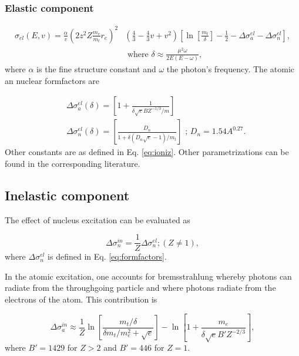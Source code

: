 \subsubsection{Elastic component}
\begin{equation}
\begin{split}
\sigma_{el} (E,v) = \frac{ \alpha}{v} \left(2 z^2 Z \frac{m_e}{m_t} r_e\right)^2
 &\left(\frac{4}{3} - \frac{4}{3}v +v^2 \right) \left[\ln \left[\frac{m_t}{\delta}\right] - \frac{1}{2} - \Delta \sigma^{el}_a -\Delta \sigma^{el}_ n \right],\\
& \textrm{ \ \ where \ \ } \delta \approx \frac{\mu^2 \omega}{2E(E-\omega)},
\end{split}
\end{equation}
where $\alpha$ is the fine structure constant and $\omega$ the photon's frequency. The atomic an nuclear formfactors are

\begin{equation}
\label{eq:formfactors}
\begin{split}
&\Delta \sigma^{el}_a(\delta) = \left[ 1+ \frac{1}{\delta \sqrt{e} BZ^{-1/3}/m}\right] \\
&\Delta \sigma^{el}_n(\delta) = \left[\frac{D_n}{1+\delta (D_n \sqrt{e} -1)/m_t}\right] \textrm{ \ \ ; } D_n = 1.54 {A^0.27}.
\end{split}
\end{equation}
Other constants are as defined in Eq. \ref{eq:ioniz}. Other parametrizations can be found in the corresponding literature. 

\subsection{Inelastic component}

The effect of nucleus excitation can be evaluated as

\begin{equation}
\Delta \sigma^{in}_n = \frac{1}{Z} \Delta \sigma^{el}_n; (Z \neq 1),
 \end{equation}
where $\Delta \sigma^{el}_n$ is defined in Eq. \ref{eq:formfactors}.

In the atomic excitation, one accounts for bremsstrahlung whereby photons can radiate from the throughgoing particle and where photons radiate from the electrons of the atom. This contribution is

\begin{equation}
\Delta \sigma^{in}_a \approx \frac{1}{Z} \ln \left[ \frac{m_t/\delta}{\delta m_t/m_e^2 + \sqrt{e}} \right] - \ln\left[1+ \frac{m_e}{\delta \sqrt{e} B' Z^{-2/3}} \right],
\end{equation}
where $B'=1429$ for $Z > 2$ and $B' = 446$ for $Z=1$.
